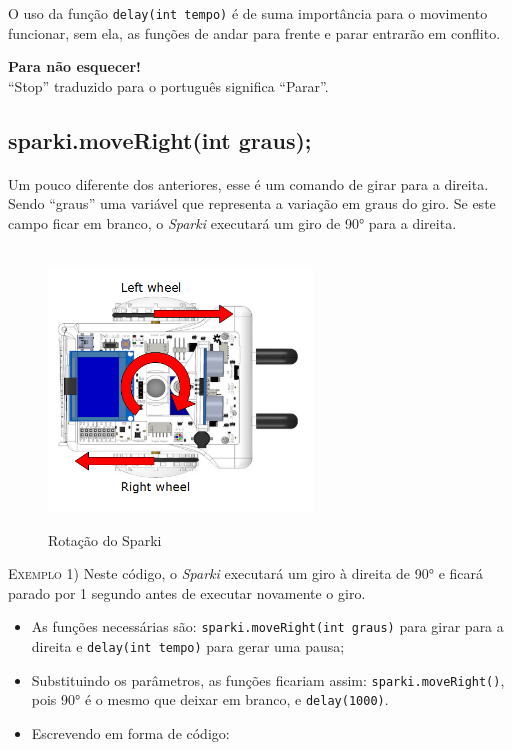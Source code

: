    O uso da função \lstinline[columns=fixed]{delay(int tempo)} é de suma importância para o movimento funcionar, sem ela, as funções de andar para frente e parar entrarão em conflito.
    
    \begin{center}
    \textcolor{mydarkblue}{\textbf{Para não esquecer!}}
    \\``Stop'' traduzido para o português significa ``Parar''.
    \end{center}
    
\subsection{sparki.moveRight(int graus);}

    \paragraph{}
    Um pouco diferente dos anteriores, esse é um comando de girar para a direita. Sendo ``graus'' uma variável que representa a variação em graus do giro. Se este campo ficar em branco, o \textsl{Sparki} executará um giro de 90° para a direita.
    \\~\\
    
    \begin{figure}[h]
    \caption{Rotação do Sparki}
     
    \centering 
    \includegraphics[width=7cm]{Figuras/rotation.png}
    \label{figura:rotation.png}
    \end{figure}
    
    \textsc{Exemplo 1)} Neste código, o \textsl{Sparki} executará um giro à direita de 90° e ficará parado por 1 segundo antes de executar novamente o giro.
    
    \begin{itemize}
        \item As funções necessárias são: \lstinline[columns=fixed]{sparki.moveRight(int graus)} para girar para a direita e \lstinline[columns=fixed]{delay(int tempo)} para gerar uma pausa;
        \item Substituindo os parâmetros, as funções ficariam assim: \lstinline[columns=fixed]{sparki.moveRight()}, pois 90° é o mesmo que deixar em branco, e \lstinline[columns=fixed]{delay(1000)}.
        \item Escrevendo em forma de código:
    \end{itemize}
    
